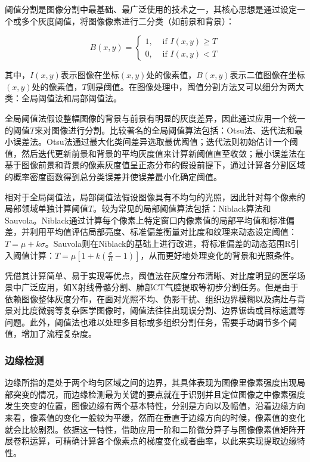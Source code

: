 阈值分割是图像分割中最基础、最广泛使用的技术之一，其核心思想是通过设定一个或多个灰度阈值，将图像像素进行二分类（如前景和背景）：

\begin{equation}
B(x, y)=\left\{\begin{array}{ll}1, & \text { if } I(x, y) \geq T \\ 0, & \text { if } I(x, y)<T\end{array}\right.
\end{equation}

其中，$I(x, y)$表示图像在坐标$(x, y)$处的像素值，$B(x, y)$表示二值图像在坐标$(x, y)$处的像素值，$T$则是阈值。在图像处理中，阈值分割方法又可以细分为两大类：全局阈值法和局部阈值法。

全局阈值法假设整幅图像的背景与前景有明显的灰度差异，因此通过应用一个统一的阈值$T$来对图像进行分割。比较著名的全局阈值算法包括：Otsu法、迭代法和最小误差法。Otsu法通过最大化类间差异选取最优阈值；迭代法则初始估计一个阈值，然后迭代更新前景和背景的平均灰度值来计算新阈值直至收敛；最小误差法在基于图像前景和背景的像素灰度值呈正态分布的假设前提下，通过计算各分割区域的概率密度函数得到总分类误差并使误差最小化确定阈值。

相对于全局阈值法，局部阈值法假设图像具有不均匀的光照，因此针对每个像素的局部领域单独计算阈值$T$。较为常见的局部阈值算法包括：Niblack算法和Sauvola。Niblack通过计算每个像素上特定窗口内像素值的局部平均值和标准偏差，并利用平均值评估局部亮度、标准偏差衡量对比度和纹理来动态设定阈值：$ T=\mu+k \sigma $。Sauvola则在Niblack的基础上进行改进，将标准偏差的动态范围R引入阈值计算：$ T=\mu\left[1+k\left(\frac{\sigma}{R}-1\right)\right] $，从而更好地处理变化的背景和光照条件。

凭借其计算简单、易于实现等优点，阈值法在灰度分布清晰、对比度明显的医学场景中广泛应用，如X射线骨骼分割、肺部CT气腔提取等初步分割任务。但是由于依赖图像整体灰度分布，在面对光照不均、伪影干扰、组织边界模糊以及病灶与背景对比度微弱等复杂医学图像时，阈值法往往出现误分割、边界锯齿或目标遗漏等问题。此外，阈值法也难以处理多目标或多组织分割任务，需要手动调节多个阈值，增加了流程复杂度。

\subsubsection{边缘检测}


边缘所指的是处于两个均匀区域之间的边界，其具体表现为图像里像素强度出现局部突变的情况，而边缘检测最为关键的要点就在于识别并且定位图像之中像素强度发生突变的位置，图像边缘有两个基本特性，分别是方向以及幅值，沿着边缘方向来看，像素值的变化一般较为平缓，然而在垂直于边缘方向的时候，像素值的变化就会比较剧烈。依据这一特性，借助应用一阶和二阶微分算子与图像像素值矩阵开展卷积运算，可精确计算各个像素点的梯度变化或者曲率，以此来实现提取边缘特性\cite{ziou1998edge}。


